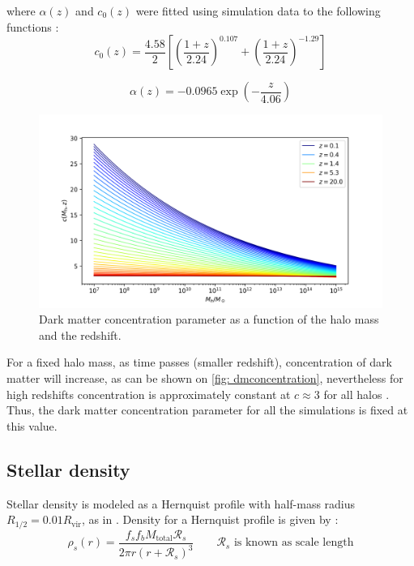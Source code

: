 			where $\alpha(z)$ and $c_0(z)$ were fitted using simulation data to the following functions \cite{choksi2017recoiling}:
			\begin{equation}
				c_0(z) = \dfrac{4.58}{2}\left[\left(\dfrac{1 + z}{2.24}\right)^{0.107} + \left(\dfrac{1 + z}{2.24}\right)^{-1.29}\right]
			\end{equation}
			
			\begin{equation}
				\alpha(z) = -0.0965 \exp\left(-\dfrac{z}{4.06}\right)
			\end{equation}
			
			\begin{figure}[h]
				\centering
				\includegraphics[width=0.7\linewidth]{"../Files/Week 3/darkmatter_concentration"}
				\caption{Dark matter concentration parameter as a function of the halo mass and the redshift.}
				\label{fig: dmconcentration}
			\end{figure}
			
			For a fixed halo mass, as time passes (smaller redshift), concentration of dark matter will increase, as can be shown on \autoref{fig: dmconcentration}, nevertheless for high redshifts concentration is approximately constant at $c \approx 3$ for all halos \cite{choksi2017recoiling}. Thus, the dark matter concentration parameter for all the simulations is fixed at this value.
	
		\subsection{Stellar density}
			Stellar density is modeled as a Hernquist profile with half-mass radius $R_{1/2} = 0.01 R_\text{vir}$, as in \citeauthor{choksi2017recoiling}. Density for a Hernquist profile is given by \cite{hernquist1990analytical}:
			\begin{equation}\label{eq: sdensity}
				\rho_s(r) = \dfrac{f_sf_bM_\text{total} \mathcal{R}_s}{2\pi r(r + \mathcal{R}_s)^3} \qquad \text{$\mathcal{R}_s$ is known as scale length}
			\end{equation}
			
